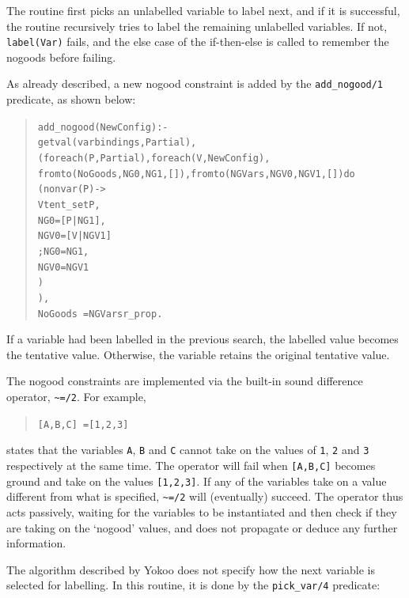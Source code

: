 \noindent
The routine first picks an unlabelled variable to label next, and 
if it is successful, the
routine recursively tries to label the remaining unlabelled variables. If
not, \verb'label(Var)' fails, and the else case of the if-then-else is
called to remember the nogoods before failing.

As already described, a new nogood constraint is added by the
\verb'add_nogood/1' predicate, as shown below:

\begin{quote}\begin{alltt}
add_nogood(NewConfig) :-
        getval(varbindings, Partial),
        (foreach(P, Partial), foreach(V,NewConfig), 
         fromto(NoGoods,NG0, NG1, []), fromto(NGVars,NGV0,NGV1,[]) do 
            (nonvar(P) ->
                V tent_set P,
                NG0 = [P|NG1],
                NGV0 = [V|NGV1]
            ;   NG0 = NG1,   %
                NGV0 = NGV1
            )
        ),
        NoGoods ~= NGVars r_prop. %
\end{alltt}\end{quote}

If a variable had been labelled in the previous search, the labelled value
becomes the tentative value. Otherwise, the variable retains the original
tentative value.

The nogood constraints are implemented via the built-in sound difference
operator, \verb'~=/2'. For example, 

\begin{quote}\begin{alltt}
[A,B,C] ~= [1,2,3]
\end{alltt}\end{quote}

\noindent
states that the variables \verb'A', \verb'B' and \verb'C'
cannot take on the values of \verb'1', \verb'2' and \verb'3' respectively
at the same time. The operator will fail when \verb'[A,B,C]' becomes ground
and take on the values \verb'[1,2,3]'. If any of the variables take on a
value different from what is specified, \verb'~=/2' will (eventually)
succeed. The operator thus acts passively, waiting for the variables to be
instantiated and then check if they are taking on the `nogood' values, and
does not propagate or deduce any further information. 

The algorithm described by Yokoo does not specify how the next variable is
selected for labelling. In this routine, it is done by the
\verb'pick_var/4' predicate:

